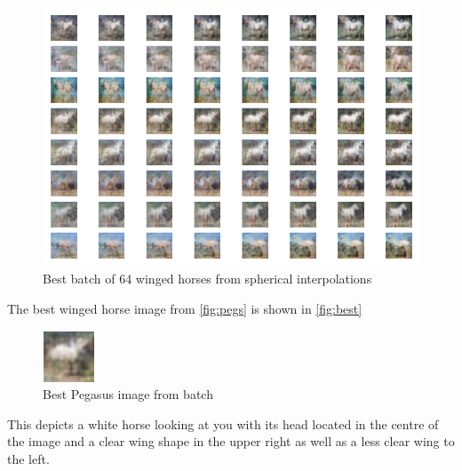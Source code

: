 \documentclass{article}
\begin{document}
\begin{figure}[h]
    \centering
    \includegraphics{pegs}
    \caption{Best batch of 64 winged horses from spherical interpolations}
    \label{fig:pegs}
\end{figure}
The best winged horse image from \autoref{fig:pegs} is shown in \autoref{fig:best}
\begin{figure}[h]
    \centering
    \includegraphics{Best_peg}
    \caption{Best Pegasus image from batch}
    \label{fig:best}
\end{figure}
This depicts a white horse looking at you with its head located in the centre of the image and a clear wing shape in the upper right as well as a less clear wing to the left.
\end{document}
